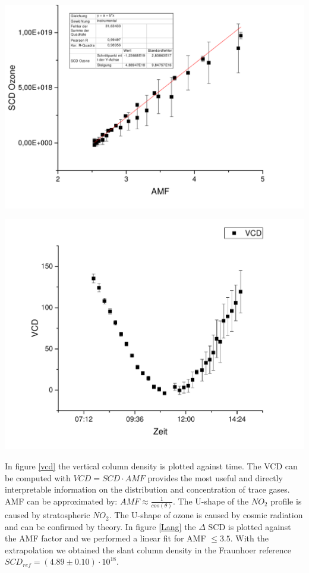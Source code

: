 \documentclass[12pt, english]{scrartcl} %
\newenvironment{Figure}
  {\par\medskip\noindent\minipage{\linewidth}}
  {\endminipage\par\medskip}
\begin{document}
\begin{multicols}{2}
\begin{Figure}
  \label{O2}
\end{Figure}
\begin{Figure}
 \centering
 \captionsetup{format=plain}
 \includegraphics[width=\linewidth]{graphics/o3langley.pdf}
  \label{Lang}
\end{Figure}
\begin{Figure}
 \centering
 \captionsetup{format=plain}
 \includegraphics[width=\linewidth]{graphics/03vcd.pdf}
  \label{vcd}
\end{Figure}
In figure \ref{vcd} the vertical column density is plotted against time. The VCD can be computed with $VCD = SCD \cdot AMF$ provides the most useful and directly interpretable information on the distribution and concentration of trace gases. AMF can be approximated by: $AMF \approx \frac{1}{cos(\theta)}$. The U-shape of the $NO_2$ profile is caused by stratospheric $NO_2$. The U-shape of ozone is caused by cosmic radiation and can be confirmed by theory. In figure \ref{Lang} the $\Delta$ SCD is plotted against the AMF factor and we performed a linear fit for AMF $\leq 3.5$. With the extrapolation we obtained the slant column density in the Fraunhoer reference $SCD_{ref} =( 4.89\pm 0.10 ) \cdot 10^{18} $.

\end{multicols}
\end{document}
